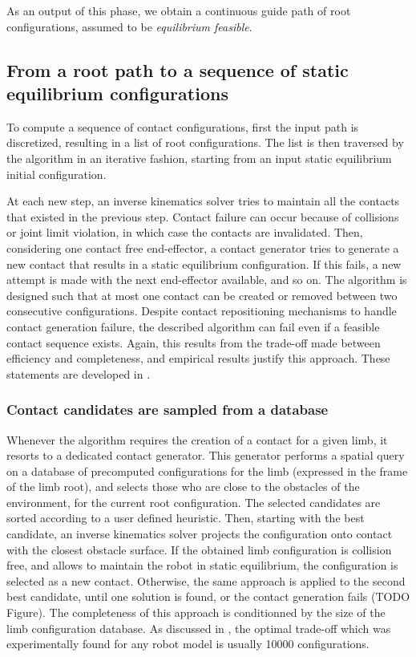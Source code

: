 As an output of this phase, we obtain a continuous guide path of root configurations, assumed to be \textit{equilibrium feasible}.

\subsection{From a root path to a sequence of static equilibrium configurations}
\label{sec:steve_contact}
To compute a sequence of contact configurations, first the input path is discretized, resulting in a list of root configurations.
The list is then traversed by the algorithm in an iterative fashion, starting from an input static equilibrium 
initial configuration. 

At each new step, an inverse kinematics solver tries to maintain all the contacts that existed in the previous step.
Contact failure can occur because of collisions or joint limit violation, in which case the contacts are invalidated.
Then, considering one contact free end-effector, a contact generator tries to generate a new contact that results in 
a static equilibrium configuration. If this fails, a new attempt is made with the next end-effector available, and so on.
The algorithm is designed such that at most one contact can be created or removed 
between two consecutive configurations.
Despite contact repositioning mechanisms to handle contact generation failure, the described algorithm can fail 
even if a feasible contact sequence exists. Again, this results from the trade-off made between efficiency and completeness, and empirical
results justify this approach. These statements are developed in \cite{tonneauijrr16}.

\subsubsection{Contact candidates are sampled from a database}
Whenever the algorithm requires the creation of a contact for a given limb, it resorts
to a dedicated contact generator. This generator performs a spatial query on a database of precomputed configurations
for the limb (expressed in the frame of the limb root), and selects those who are close to the obstacles of the environment, for the current
root configuration. The selected candidates are sorted according to a user defined heuristic. Then, starting with the best
candidate, an inverse kinematics solver projects the configuration onto contact with the closest obstacle surface. If the 
obtained limb configuration is collision free, and allows to maintain the robot in static equilibrium, the configuration
is selected as a new contact. Otherwise, the same approach is applied to the second best candidate, until one solution is found,
or the contact generation fails (TODO Figure). The completeness of this approach is conditionned by the size of the limb configuration database.
As discussed in \cite{Tonneau2014}, the optimal trade-off which was experimentally found for any robot model is usually 10000 configurations.


